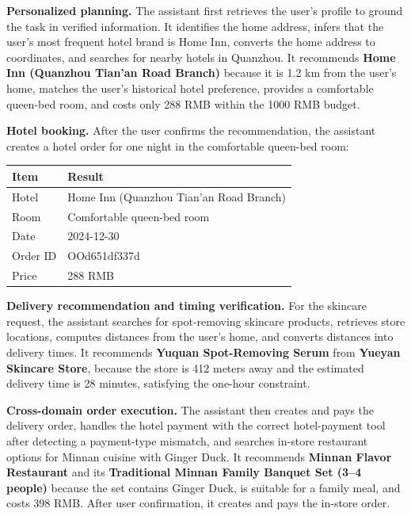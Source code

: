\documentclass{llmxive}
\begin{document}
\begin{caseresponse}
\textbf{Personalized planning.} The assistant first retrieves the user's profile to ground the task in verified information. It identifies the home address, infers that the user's most frequent hotel brand is Home Inn, converts the home address to coordinates, and searches for nearby hotels in Quanzhou. It recommends \textbf{Home Inn (Quanzhou Tian'an Road Branch)} because it is 1.2 km from the user's home, matches the user's historical hotel preference, provides a comfortable queen-bed room, and costs only 288 RMB within the 1000 RMB budget.

\textbf{Hotel booking.} After the user confirms the recommendation, the assistant creates a hotel order for one night in the comfortable queen-bed room:
\begin{center}
\begin{tabular}{ll}
\toprule
\textbf{Item} & \textbf{Result} \\
\midrule
Hotel & Home Inn (Quanzhou Tian'an Road Branch) \\
Room & Comfortable queen-bed room \\
Date & 2024-12-30 \\
Order ID & OOd651df337d \\
Price & 288 RMB \\
\bottomrule
\end{tabular}
\end{center}

\textbf{Delivery recommendation and timing verification.} For the skincare request, the assistant searches for spot-removing skincare products, retrieves store locations, computes distances from the user's home, and converts distances into delivery times. It recommends \textbf{Yuquan Spot-Removing Serum} from \textbf{Yueyan Skincare Store}, because the store is 412 meters away and the estimated delivery time is 28 minutes, satisfying the one-hour constraint.

\textbf{Cross-domain order execution.} The assistant then creates and pays the delivery order, handles the hotel payment with the correct hotel-payment tool after detecting a payment-type mismatch, and searches in-store restaurant options for Minnan cuisine with Ginger Duck. It recommends \textbf{Minnan Flavor Restaurant} and its \textbf{Traditional Minnan Family Banquet Set (3--4 people)} because the set contains Ginger Duck, is suitable for a family meal, and costs 398 RMB. After user confirmation, it creates and pays the in-store order.


\end{caseresponse}
\end{document}
